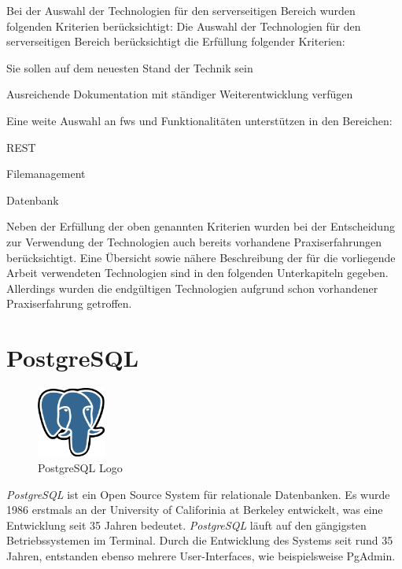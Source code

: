 Bei der Auswahl der Technologien für den serverseitigen Bereich wurden folgenden Kriterien berücksichtigt:
Die Auswahl der Technologien für den serverseitigen Bereich berücksichtigt die Erfüllung folgender Kriterien:
\begin{compactitem}
    \item Sie sollen auf dem neuesten Stand der Technik sein
    \item Ausreichende Dokumentation mit ständiger Weiterentwicklung verfügen
    \item Eine weite Auswahl an \glspl{fw} und Funktionalitäten unterstützen in den Bereichen:
    \begin{compactitem}
        \item REST
        \item Filemanagement
        \item Datenbank
    \end{compactitem}
\end{compactitem} 

Neben der Erfüllung der oben genannten Kriterien wurden bei der Entscheidung zur Verwendung der Technologien auch bereits vorhandene Praxiserfahrungen berücksichtigt. 
Eine Übersicht sowie nähere Beschreibung der für die vorliegende Arbeit verwendeten Technologien sind in den folgenden Unterkapiteln gegeben.
Allerdings wurden die endgültigen Technologien aufgrund schon vorhandener Praxiserfahrung getroffen. 

\section{PostgreSQL}
\begin{figure}
  \begin{center}
      \includegraphics[width=0.2\textwidth]{pics/logos/postgres.png}
      \caption{PostgreSQL Logo}
  \end{center}
\end{figure}
\emph{PostgreSQL} ist ein Open Source System für relationale Datenbanken. 
Es wurde 1986 erstmals an der University of Califorinia at Berkeley entwickelt, was eine Entwicklung seit 35 Jahren bedeutet.  
\emph{PostgreSQL} läuft auf den gängigsten Betriebssystemen im Terminal.
Durch die Entwicklung des Systems seit rund 35 Jahren, entstanden ebenso mehrere User-Interfaces, wie beispielsweise PgAdmin. 
\cite{PostgreSQLAbout}

